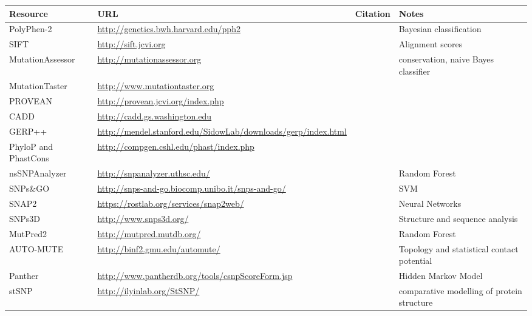 \documentclass{article}
\begin{document}
\begin{table}[p]
\centering
\begin{tabularx}{1.1\textwidth}{p{2.5cm}Xp{3.5cm}p{3.5cm}}
  \toprule
Resource & URL & Citation & Notes \\
  \midrule
  PolyPhen-2 & \url{http://genetics.bwh.harvard.edu/pph2} & \parencite{Adzhubei2013-nj} & Bayesian classification \\
  SIFT & \url{http://sift.jcvi.org} & \parencite{Ng2003-vp} & Alignment scores \\
  MutationAssessor & \url{http://mutationassessor.org} & \parencite{Reva2011-en} & conservation, naive Bayes classifier \\
  MutationTaster & \url{http://www.mutationtaster.org} & \parencite{Schwarz2014-ep} &   \\
  PROVEAN & \url{http://provean.jcvi.org/index.php} & \parencite{Choi2012-tk} &   \\
  CADD & \url{http://cadd.gs.washington.edu} & \parencite{Kircher2014-im} &   \\
  GERP++ & \url{http://mendel.stanford.edu/SidowLab/downloads/gerp/index.html} & \parencite{Davydov2010-ui} &   \\
  PhyloP and PhastCons & \url{http://compgen.cshl.edu/phast/index.php} & \parencite{Siepel2005-ke,Pollard2010-of} &   \\
  nsSNPAnalyzer & \url{http://snpanalyzer.uthsc.edu/} & \parencite{Bao2005-jn} & Random Forest \\
  SNPs\&GO & \url{http://snps-and-go.biocomp.unibo.it/snps-and-go/} & \parencite{Calabrese2009-mi} & SVM \\
  SNAP2 & \url{https://rostlab.org/services/snap2web/} & \parencite{Hecht2015-ti} & Neural Networks \\
  SNPs3D & \url{http://www.snps3d.org/} & \parencite{Yue2006-kj} & Structure and sequence analysis \\
  MutPred2 & \url{http://mutpred.mutdb.org/} & \parencite{Pejaver2017-lr} & Random Forest \\
  AUTO-MUTE & \url{http://binf2.gmu.edu/automute/} & \parencite{Masso2010-gf} & Topology and statistical contact potential\\ 
  Panther & \url{http://www.pantherdb.org/tools/csnpScoreForm.jsp} & \parencite{Thomas2003-rj} & Hidden Markov Model \\
  stSNP & \url{http://ilyinlab.org/StSNP/} & \parencite{Uzun2007-bk} &
  comparative modelling of protein structure \\
  \midrule

\end{tabularx}
\end{table}
\end{document}
